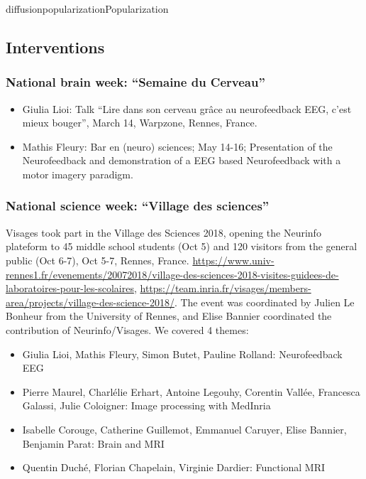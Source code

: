 \documentclass{ra2018}
\begin{document}
\begin{module}{diffusion}{popularization}{Popularization}
\subsection{Interventions}


\subsubsection{National brain week: ``Semaine du Cerveau''}
\begin{itemize}
    \item Giulia Lioi: Talk ``Lire dans son cerveau grâce au neurofeedback EEG, c’est mieux bouger'', March 14, Warpzone, Rennes, France. 
    \item Mathis Fleury: Bar en (neuro) sciences; May 14-16; Presentation of the Neurofeedback and demonstration of a EEG based Neurofeedback with a motor imagery paradigm. 
\end{itemize}

\subsubsection{National science week: ``Village des sciences''}
Visages took part in the Village des Sciences 2018, opening the Neurinfo plateform to 45 middle school students (Oct 5) and 120 visitors from the general public (Oct 6-7), Oct 5-7, Rennes, France. \url{https://www.univ-rennes1.fr/evenements/20072018/village-des-sciences-2018-visites-guidees-de-laboratoires-pour-les-scolaires}, \url{https://team.inria.fr/visages/members-area/projects/village-des-science-2018/}. The event was coordinated by Julien Le Bonheur from the University of Rennes, and Elise Bannier coordinated the contribution of Neurinfo/Visages. We covered 4 themes: 
\begin{itemize}
        \item Giulia Lioi, Mathis Fleury, Simon Butet, Pauline Rolland: Neurofeedback EEG
        \item Pierre Maurel, Charlélie Erhart, Antoine Legouhy, Corentin Vallée, Francesca Galassi, Julie Coloigner: Image processing with MedInria
        \item Isabelle Corouge, Catherine Guillemot, Emmanuel Caruyer, Elise Bannier, Benjamin Parat: Brain and MRI
        \item Quentin Duché, Florian Chapelain, Virginie Dardier: Functional MRI
\end{itemize}


\end{module}
\end{document}
